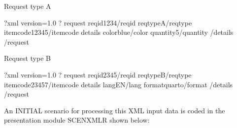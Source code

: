 \documentclass[letterpaper,10pt,english]{sphinxmanual}
\begin{document}
\begin{sphinxVerbatim}[commandchars=\\\{\}]
Request type A

\PYGZlt{}?xml version=\PYGZdq{}1.0\PYGZdq{} ?\PYGZgt{}
\PYGZlt{}request\PYGZgt{}
    \PYGZlt{}reqid\PYGZgt{}1234\PYGZlt{}/reqid\PYGZgt{}
    \PYGZlt{}reqtype\PYGZgt{}A\PYGZlt{}/reqtype\PYGZgt{}
    \PYGZlt{}itemcode\PYGZgt{}12345\PYGZlt{}/itemcode\PYGZgt{}
    \PYGZlt{}details\PYGZgt{}
        \PYGZlt{}color\PYGZgt{}blue\PYGZlt{}/color\PYGZgt{}
        \PYGZlt{}quantity\PYGZgt{}5\PYGZlt{}/quantity\PYGZgt{}
    \PYGZlt{}/details\PYGZgt{}
\PYGZlt{}/request\PYGZgt{}

Request type B

\PYGZlt{}?xml version=\PYGZdq{}1.0\PYGZdq{} ?\PYGZgt{}
\PYGZlt{}request\PYGZgt{}
    \PYGZlt{}reqid\PYGZgt{}2345\PYGZlt{}/reqid\PYGZgt{}
    \PYGZlt{}reqtype\PYGZgt{}B\PYGZlt{}/reqtype\PYGZgt{}
    \PYGZlt{}itemcode\PYGZgt{}23457\PYGZlt{}/itemcode\PYGZgt{}
    \PYGZlt{}details\PYGZgt{}
        \PYGZlt{}lang\PYGZgt{}EN\PYGZlt{}/lang\PYGZgt{}
        \PYGZlt{}format\PYGZgt{}quarto\PYGZlt{}/format\PYGZgt{}
    \PYGZlt{}/details\PYGZgt{}
\PYGZlt{}/request\PYGZgt{}
\end{sphinxVerbatim}


An INITIAL scenario for processing this XML input data is coded in the presentation module SCENXMLR shown below:
\end{document}
